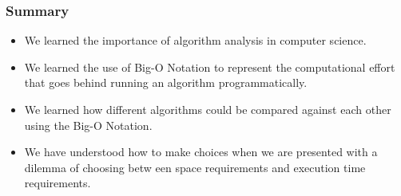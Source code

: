 \documentclass{beamer}
\begin{document}
\begin{frame}
\frametitle{Summary}
\begin{itemize}
\item We learned the importance of algorithm analysis in computer science.
\item We learned the use of Big-O Notation to represent the computational effort that goes behind running an algorithm programmatically.
\item We learned how different algorithms could be compared against each other using the Big-O Notation.
\item We have understood how to make choices when we are presented with a dilemma of choosing betw	een space requirements and execution time requirements.
\end{itemize}
\end{frame}
\end{document}
